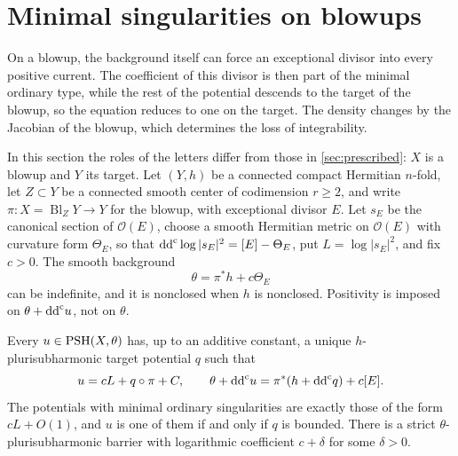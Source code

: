 \section{Minimal singularities on blowups}\label{sec:blowups}

On a blowup, the background itself can force an exceptional divisor into every positive current. The coefficient of this divisor is then part of the minimal ordinary type, while the rest of the potential descends to the target of the blowup, so the equation reduces to one on the target. The density changes by the Jacobian of the blowup, which determines the loss of integrability.

In this section the roles of the letters differ from those in \cref{sec:prescribed}: $X$ is a blowup and $Y$ its target. Let $(Y,h)$ be a connected compact Hermitian $n$-fold, let $Z\subset Y$ be a connected smooth center of codimension $r\geq2$, and write $\pi\colon X=\operatorname{Bl}_ZY\to Y$ for the blowup, with exceptional divisor $E$. Let $s_E$ be the canonical section of $\mathcal O(E)$, choose a smooth Hermitian metric on $\mathcal O(E)$ with curvature form $\Theta_E$, so that $\mathrm{dd}^{\mathrm{c}}\log|s_E|^2=[E]-\Theta_E$, put $L=\log|s_E|^2$, and fix $c>0$. The smooth background
\begin{equation}\label{eq:blowup-background}
 \theta=\pi^*h+c\Theta_E
\end{equation}
can be indefinite, and it is nonclosed when $h$ is nonclosed. Positivity is imposed on $\theta+\mathrm{dd}^{\mathrm{c}} u$, not on $\theta$.

\begin{proposition}\label{prop:blowup-representation}
Every $u\in\mathrm{PSH}(X,\theta)$ has, up to an additive constant, a unique $h$-plurisubharmonic target potential $q$ such that
\begin{equation}\label{eq:blowup-representation}
 u=cL+q\circ\pi+C,
 \qquad
 \theta+\mathrm{dd}^{\mathrm{c}} u=\pi^*(h+\mathrm{dd}^{\mathrm{c}} q)+c[E].
\end{equation}
The potentials with minimal ordinary singularities are exactly those of the form $cL+O(1)$, and $u$ is one of them if and only if $q$ is bounded. There is a strict $\theta$-plurisubharmonic barrier with logarithmic coefficient $c+\delta$ for some $\delta>0$.
\end{proposition}

